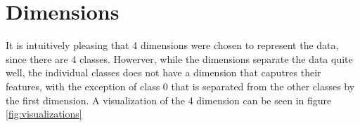 \documentclass[a4paper,draft=false]{scrreprt}\usepackage[]{graphicx}\usepackage[]{color}
\begin{document}
\begin{table}[ht]
\centering
{}
\caption{Mean error rates for different models over 10-fold cross validation.\label{table:meanerror}} 
\end{table}
\begin{table}[ht]
\centering
{}
\caption{Standard errors for different models over 10-fold cross validation.\label{table:stderror}} 
\end{table}


{\let\clearpage\relax \chapter{Dimensions}}
It is intuitively pleasing that 4 dimensions were chosen to represent the data, since there are 4 classes. Howerver, while the dimensions separate the data quite well, the individual classes does not have a dimension that caputres their features, with the exception of class 0 that is separated from the other classes by the first dimension. A visualization of the 4 dimension can be seen in figure \ref{fig:visualizations}
\end{document}
